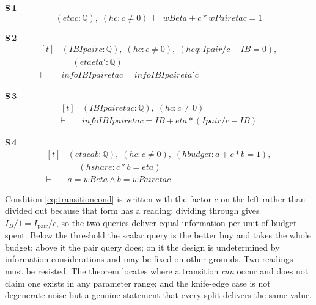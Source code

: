 \noindent\textbf{S\,1}\quad{}
{\footnotesize\[ (\mathit{eta} \mathit{c} : \mathbb{Q} ),\; (\mathit{hc} : \mathit{c} \neq 0) \;\vdash\; \mathit{wB} \mathit{eta} + \mathit{c} * \mathit{wPair} \mathit{eta} \mathit{c} = 1 \]}

\noindent\textbf{S\,2}\quad{}
{\footnotesize\[ \begin{aligned}[t]
&(\mathit{IB} \mathit{Ipair} \mathit{c} : \mathbb{Q} ),\; (\mathit{hc} : \mathit{c} \neq 0),\; (\mathit{heq} : \mathit{Ipair} / \mathit{c} - \mathit{IB} = 0),\\
&\quad \; (\mathit{eta} \mathit{eta'} : \mathbb{Q} )\\
\vdash\;&\mathit{info} \mathit{IB} \mathit{Ipair} \mathit{eta} \mathit{c} = \mathit{info} \mathit{IB} \mathit{Ipair} \mathit{eta'} \mathit{c}
\end{aligned} \]}

\noindent\textbf{S\,3}\quad{}
{\footnotesize\[ \begin{aligned}[t]
&(\mathit{IB} \mathit{Ipair} \mathit{eta} \mathit{c} : \mathbb{Q} ),\; (\mathit{hc} : \mathit{c} \neq 0)\\
\vdash\;&\mathit{info} \mathit{IB} \mathit{Ipair} \mathit{eta} \mathit{c} = \mathit{IB} + \mathit{eta} * (\mathit{Ipair} / \mathit{c} - \mathit{IB})
\end{aligned} \]}

\noindent\textbf{S\,4}\quad{}
{\footnotesize\[ \begin{aligned}[t]
&(\mathit{eta} \mathit{c} \mathit{a} \mathit{b} : \mathbb{Q} ),\; (\mathit{hc} : \mathit{c} \neq 0),\; (\mathit{hbudget} : \mathit{a} + \mathit{c} * \mathit{b} = 1),\\
&\quad \; (\mathit{hshare} : \mathit{c} * \mathit{b} = \mathit{eta})\\
\vdash\;&\mathit{a} = \mathit{wB} \mathit{eta} \wedge \mathit{b} = \mathit{wPair} \mathit{eta} \mathit{c}
\end{aligned} \]}


Condition \eqref{eq:transitioncond} is written with the factor $c$ on the left rather than
divided out because that form has a reading: dividing through gives
$I_{B}/1=I_{\mathrm{pair}}/c$, so the two queries deliver equal information per unit of budget
spent. Below the threshold the scalar query is the better buy and takes the whole budget;
above it the pair query does; on it the design is undetermined by information considerations
and may be fixed on other grounds. Two readings must be resisted. The theorem locates where a
transition \emph{can} occur and does not claim one exists in any parameter range; and the
knife-edge case is not degenerate noise but a genuine statement that every split delivers the
same value.

